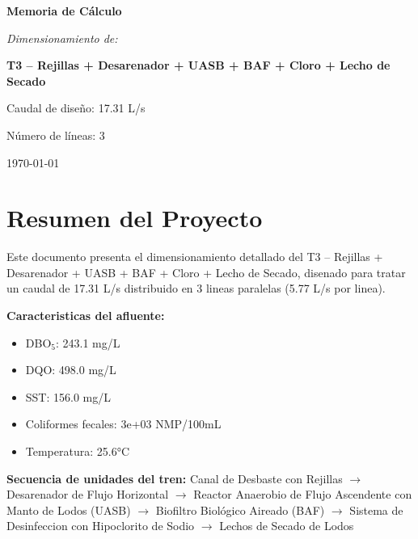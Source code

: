 \documentclass[12pt,a4paper]{article}
\begin{document}
\begin{titlepage}
\centering
\vspace*{2cm}

{\Huge\bfseries Memoria de Cálculo\par}
\vspace{1.5cm}

{\Large\itshape Dimensionamiento de:\par}
\vspace{0.5cm}

{\LARGE\bfseries T3 – Rejillas + Desarenador + UASB + BAF + Cloro + Lecho de Secado\par}
\vspace{2cm}

{\large Caudal de diseño: 17.31 L/s\par}
{\large Número de líneas: 3\par}
\vfill
{\large\today\par}
\end{titlepage}

\tableofcontents

\listoffigures

\listoftables

\newpage
\section{Resumen del Proyecto}

Este documento presenta el dimensionamiento detallado del T3 – Rejillas + Desarenador + UASB + BAF + Cloro + Lecho de Secado, disenado para tratar un caudal de 17.31 L/s distribuido en 3 lineas paralelas (5.77 L/s por linea).

\textbf{Caracteristicas del afluente:}
\begin{itemize}
    \item DBO$_5$: 243.1 mg/L
    \item DQO: 498.0 mg/L
    \item SST: 156.0 mg/L
    \item Coliformes fecales: 3e+03 NMP/100mL
    \item Temperatura: 25.6°C
\end{itemize}

\textbf{Secuencia de unidades del tren:} 
Canal de Desbaste con Rejillas $\rightarrow$ Desarenador de Flujo Horizontal $\rightarrow$ Reactor Anaerobio de Flujo Ascendente con Manto de Lodos (UASB) $\rightarrow$ Biofiltro Biológico Aireado (BAF) $\rightarrow$ Sistema de Desinfeccion con Hipoclorito de Sodio $\rightarrow$ Lechos de Secado de Lodos
\end{document}
